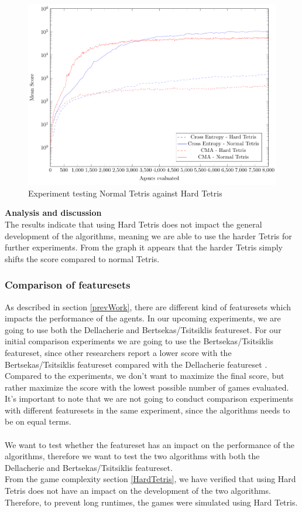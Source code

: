 \begin{figure}[H]
\centering
\includegraphics[scale=0.8]{data/complexity/mean/PlotFile.pdf}
\caption{Experiment testing Normal Tetris against Hard Tetris}
\end{figure}

\textbf{Analysis and discussion}\\
The results indicate that using Hard Tetris does not impact the general development of the algorithms, meaning we are able to use the harder Tetris for further experiments. From the graph it appears that the harder Tetris simply shifts the score compared to normal Tetris.
\\


\subsubsection{Comparison of featuresets  \label{compoffeatureset}}
As described in section \ref{prevWork}, there are different kind of featuresets which
impacts the performance of the agents. In our upcoming experiments, we are going to
use both the Dellacherie and Bertsekas/Tsitsiklis featureset. For our initial comparison experiments
we are going to use the Bertsekas/Tsitsiklis featureset, since other researchers report
a lower score with the Bertsekas/Tsitsiklis featureset compared with the Dellacherie featureset
\citep{thiery:09}. Compared to the \citep{thiery:09} experiments, we don't want to maximize the
final score, but rather maximize the score with the lowest possible number of 
games evaluated.\\
It's important to note that we are not going to conduct comparison experiments with different
featuresets in the same experiment, since the algorithms needs to be on equal terms.\\
\\
We want to test whether the featureset has an impact on the performance of the algorithms,
therefore we want to test the two algorithms with both the Dellacherie and Bertsekas/Tsitsiklis featureset.\\
From the game complexity section \ref{HardTetris}, we have verified that using Hard Tetris
\citep{boumaza2009} does not have an impact on the development of the two algorithms.
Therefore, to prevent long runtimes, the games were simulated
using Hard Tetris.\\

